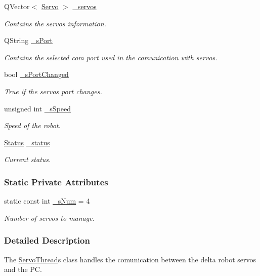 \begin{DoxyCompactItemize}
Q\+Vector$<$ \hyperlink{a00007}{Servo} $>$ \hyperlink{a00009_a1ac6662fe6d198b5971ae0ffa7ddfcfd}{\+\_\+servos}
\begin{DoxyCompactList}\small\item\em Contains the servos information. \end{DoxyCompactList}\item 
Q\+String \hyperlink{a00009_ac9a614aa1518efb49b0a06636bd1bdbf}{\+\_\+s\+Port}
\begin{DoxyCompactList}\small\item\em Contains the selected com port used in the comunication with servos. \end{DoxyCompactList}\item 
bool \hyperlink{a00009_a6e803432db01b10ed975132315280fd3}{\+\_\+s\+Port\+Changed}
\begin{DoxyCompactList}\small\item\em True if the servos port changes. \end{DoxyCompactList}\item 
unsigned int \hyperlink{a00009_a2591c704c80518be7abb1698364cab5e}{\+\_\+s\+Speed}
\begin{DoxyCompactList}\small\item\em Speed of the robot. \end{DoxyCompactList}\item 
\hyperlink{a00009_a3c23985ab5e94c14f5e6fca0a9338f9c}{Status} \hyperlink{a00009_a8d2299f41165bffe1656df776f7f7528}{\+\_\+status}
\begin{DoxyCompactList}\small\item\em Current status. \end{DoxyCompactList}\end{DoxyCompactItemize}
\subsubsection*{Static Private Attributes}
\begin{DoxyCompactItemize}
\item 
static const int \hyperlink{a00009_a334e0c5bca9ccb2585cb82bce60ea42f}{\+\_\+s\+Num} = 4
\begin{DoxyCompactList}\small\item\em Number of servos to manage. \end{DoxyCompactList}\end{DoxyCompactItemize}


\subsubsection{Detailed Description}
The \hyperlink{a00009}{Servo\+Thread}\textquotesingle{}s class handles the comunication between the delta robot servos and the P\+C. 



